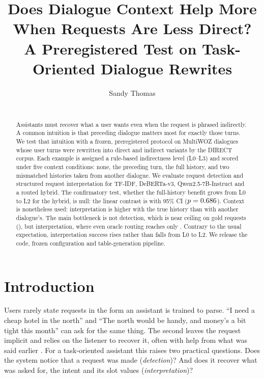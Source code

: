 \documentclass{article}
\title{Does Dialogue Context Help More When Requests Are Less Direct?\\
A Preregistered Test on Task-Oriented Dialogue Rewrites}
\author{%
  Sandy Thomas\\
  \todo{affiliation}\\
}
\begin{document}
\maketitle

\begin{abstract}
Assistants must recover what a user wants even when the request is phrased indirectly. A common
intuition is that preceding dialogue matters most for exactly those turns. We test that intuition
with a frozen, preregistered protocol on MultiWOZ dialogues whose user turns were rewritten into
direct and indirect variants by the DIRECT corpus. Each example is assigned a rule-based
indirectness level (L0--L3) and scored under five context conditions: none, the preceding turn,
the full history, and two mismatched histories taken from another dialogue. We evaluate request
detection and structured request interpretation for TF-IDF, DeBERTa-v3, Qwen2.5-7B-Instruct and a
routed hybrid. The confirmatory test, whether the full-history benefit grows from L0 to L2 for the
hybrid, is null: the linear contrast is \PrimaryEst{} with 95\% CI \PrimaryCI{} ($p=0.686$).
Context is nonetheless used: interpretation is \ControlEst{} \ControlCI{} higher with the true
history than with another dialogue's. The main bottleneck is not detection, which is near ceiling on gold
requests (\DetectFull), but interpretation, where even oracle routing reaches only \OracleFull.
Contrary to the usual expectation, interpretation success rises rather than falls from L0 to L2.
We release the code, frozen configuration and table-generation pipeline.
\end{abstract}

\section{Introduction}
\label{sec:intro}

Users rarely state requests in the form an assistant is trained to parse. ``I need a cheap hotel
in the north'' and ``The north would be handy, and money's a bit tight this month'' can ask for
the same thing. The second leaves the request implicit and relies on the listener to recover it,
often with help from what was said earlier \citep{searle1975indirect,blumkulka1989ccsarp}. For a
task-oriented assistant this raises two practical questions. Does the system notice that a
request was made (\emph{detection})? And does it recover what was asked for, the intent and its
slot values (\emph{interpretation})?
\end{document}
